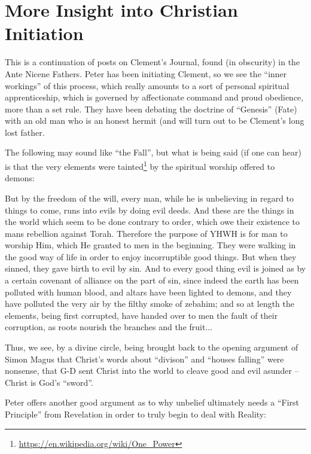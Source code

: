 \section{More Insight into Christian Initiation}

This is a continuation of posts on Clement's Journal, found (in obscurity) in the Ante Nicene Fathers. Peter has been initiating Clement, so we see the ``inner workings'' of this process, which really amounts to a sort of personal spiritual apprenticeship, which is governed by affectionate command and proud obedience, more than a set rule. They have been debating the doctrine of ``Genesis'' (Fate) with an old man who is an honest hermit (and will turn out to be Clement's long lost father.

The following may sound like ``the Fall'', but what is being said (if one can hear) is that the very elements were tainted\footnote{\url{https://en.wikipedia.org/wiki/One\_Power}} by the spiritual worship offered to demons:

\begin{quotex}
But by the freedom of the will, every man, while he is unbelieving in regard to things to come, runs into evils by doing evil deeds. And these are the things in the world which seem to be done contrary to order, which owe their existence to mans rebellion against Torah. Therefore the purpose of YHWH is for man to worship Him, which He granted to men in the beginning. They were walking in the good way of life in order to enjoy incorruptible good things. But when they sinned, they gave birth to evil by sin. And to every good thing evil is joined as by a certain covenant of alliance on the part of sin, since indeed the earth has been polluted with human blood, and altars have been lighted to demons, and they have polluted the very air by the filthy smoke of zebahim; and so at length the elements, being first corrupted, have handed over to men the fault of their corruption, as roots nourish the branches and the fruit... 
\end{quotex}

Thus, we see, by a divine circle, being brought back to the opening argument of Simon Magus that Christ's words about ``divison'' and ``houses falling'' were nonsense, that G-D sent Christ into the world to cleave good and evil asunder -- Christ is God's ``sword''.

Peter offers another good argument as to why unbelief ultimately needs a ``First Principle'' from Revelation in order to truly begin to deal with Reality:

